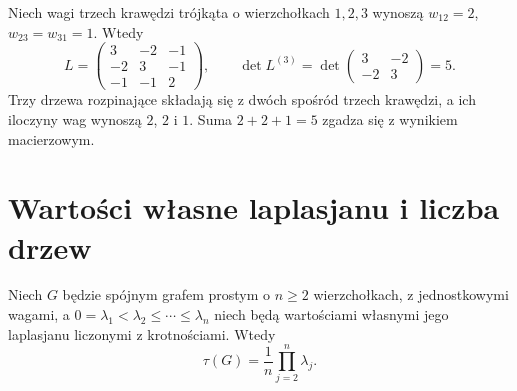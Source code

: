 \begin{przyklad}
Niech wagi trzech krawędzi trójkąta o wierzchołkach
$1,2,3$ wynoszą $w_{12}=2$, $w_{23}=w_{31}=1$.
Wtedy
\[
L=\begin{pmatrix}3&-2&-1\\-2&3&-1\\-1&-1&2\end{pmatrix},
\qquad
\det L^{(3)}=\det\begin{pmatrix}3&-2\\-2&3\end{pmatrix}=5.
\]
Trzy drzewa rozpinające składają się z dwóch spośród
trzech krawędzi, a ich iloczyny wag wynoszą $2$, $2$
i $1$. Suma $2+2+1=5$ zgadza się z wynikiem macierzowym.
\end{przyklad}

\begin{center}
\end{center}

\section{Wartości własne laplasjanu i liczba drzew}
\label{sec:tg-spectrum-tree}

\begin{twierdzenie}
\label{thm:tg-spectral-tree}
Niech $G$ będzie spójnym grafem prostym o $n\ge2$
wierzchołkach, z jednostkowymi wagami, a
$0=\lambda_1<\lambda_2\le\cdots\le\lambda_n$
niech będą wartościami własnymi jego laplasjanu
liczonymi z krotnościami. Wtedy
\[
\tau(G)=\frac1n\prod_{j=2}^n\lambda_j.
\]
\end{twierdzenie}

